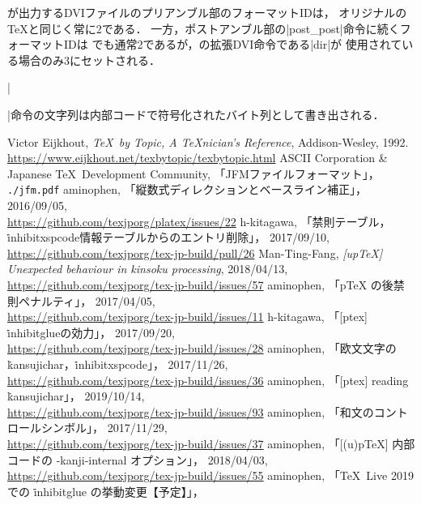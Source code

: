 \documentclass[a4paper,11pt,nomag,dvipdfmx]{jsarticle}
\begin{document}
\pTeX が出力するDVIファイルのプリアンブル部のフォーマットIDは，
オリジナルの\TeX と同じく常に2である．
一方，ポストアンブル部の|post_post|命令に続くフォーマットIDは
\pTeX でも通常2であるが，\pTeX の拡張DVI命令である|dir|が
使用されている場合のみ3にセットされる．

|\special|命令の文字列は内部コードで符号化されたバイト列として書き出される．

\begin{thebibliography}{99}
  Victor Eijkhout, \textit{\TeX\ by Topic, A \TeX nician's Reference},
  Addison-Wesley, 1992.\\
  \url{https://www.eijkhout.net/texbytopic/texbytopic.html}
  ASCII Corporation \& Japanese \TeX\ Development Community, 「JFMファイルフォーマット」，
  \texttt{./jfm.pdf}
  aminophen, 「縦数式ディレクションとベースライン補正」，
  2016/09/05,\\
  \url{https://github.com/texjporg/platex/issues/22}
  h-kitagawa, 「禁則テーブル，\.{inhibitxspcode}情報テーブルからのエントリ削除」，
  2017/09/10,\\
  \url{https://github.com/texjporg/tex-jp-build/pull/26}
  Man-Ting-Fang, \textit{[upTeX] Unexpected behaviour in kinsoku processing},
  2018/04/13,\\
  \url{https://github.com/texjporg/tex-jp-build/issues/57}
  aminophen, 「pTeX の後禁則ペナルティ」，
  2017/04/05,\\
  \url{https://github.com/texjporg/tex-jp-build/issues/11}
  h-kitagawa, 「[ptex] \.{inhibitglue}の効力」，
  2017/09/20,\\
  \url{https://github.com/texjporg/tex-jp-build/issues/28}
  aminophen, 「欧文文字の\.{kansujichar}，\.{inhibitxspcode}」，
  2017/11/26,\\
  \url{https://github.com/texjporg/tex-jp-build/issues/36}
  aminophen, 「[ptex] reading \.{kansujichar}」，
  2019/10/14,\\
  \url{https://github.com/texjporg/tex-jp-build/issues/93}
  aminophen, 「和文のコントロールシンボル」，
  2017/11/29,\\
  \url{https://github.com/texjporg/tex-jp-build/issues/37}
  aminophen, 「[(u)pTeX] 内部コードの -kanji-internal オプション」，
  2018/04/03,\\
  \url{https://github.com/texjporg/tex-jp-build/issues/55}
  aminophen, 「\TeX~Live 2019 での \.{inhibitglue} の挙動変更【予定】」，

\end{thebibliography}
\end{document}
